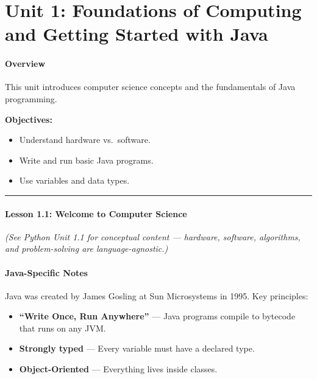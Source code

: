 \documentclass[
  justified,
  openright,
]{tufte-book}
\let\subsection\paragraph
\let\paragraph\paragraph
\let\subsection\paragraph
\let\paragraph\paragraph
\providecommand{\tightlist}{%
  \setlength{\itemsep}{0pt}\setlength{\parskip}{0pt}}
\begin{document}
\section{Unit 1: Foundations of Computing and Getting Started with
Java}\label{unit-1-foundations-of-computing-and-getting-started-with-java}

\subsection{Overview}\label{overview-15}

This unit introduces computer science concepts and the fundamentals of
Java programming.

\textbf{Objectives:}

\begin{itemize}
\tightlist
\item
  Understand hardware vs.~software.
\item
  Write and run basic Java programs.
\item
  Use variables and data types.
\end{itemize}

\begin{center}\rule{0.5\linewidth}{0.5pt}\end{center}

\subsection{Lesson 1.1: Welcome to Computer
Science}\label{lesson-1.1-welcome-to-computer-science-3}

\emph{(See Python Unit 1.1 for conceptual content --- hardware,
software, algorithms, and problem-solving are language-agnostic.)}

\subsection{Java-Specific Notes}\label{java-specific-notes}

Java was created by James Gosling at Sun Microsystems in 1995. Key
principles:

\begin{itemize}
\tightlist
\item
  \textbf{``Write Once, Run Anywhere''} --- Java programs compile to
  bytecode that runs on any JVM.
\item
  \textbf{Strongly typed} --- Every variable must have a declared type.
\item
  \textbf{Object-Oriented} --- Everything lives inside classes.
\end{itemize}
\end{document}
